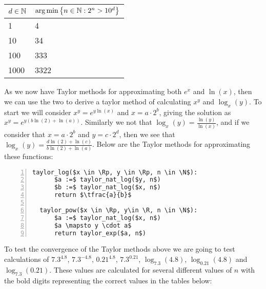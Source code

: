 \begin{center}
\begin{tabular}{|l|l|}
\hline
\(d \in \mathbb{N}\) 
	& \(\textrm{arg}\min\left\{n \in \mathbb{N} : 2^n > 10^d\right\}\)\\\hline
1 & 4\\\hline
10 & 34\\\hline
100 & 333 \\\hline
1000 & 3322\\\hline
\end{tabular}
\end{center}

As we now have Taylor methods for approximating both \(e^x\) and \(\ln(x)\), then we can use the two to derive a taylor method of calculating \(x^y\) and \(\log_x(y)\). To start we will consider \(x^y = e^{y\ln(x)}\) and \(x = a\cdot2^b\), giving the solution as \(x^y = e^{y(b\ln(2) + \ln(a))}\). Similarly we not that \(\log_x(y) = \frac{\ln(y)}{\ln(x)}\), and if we consider that \(x = a\cdot2^b\) and \(y = c\cdot2^d\), then we see that \(\log_x(y) = \frac{d\ln(2) + \ln(c)}{b\ln(2) + \ln(a)}\). Below are the Taylor methods for approximating these functions:

\begin{lstlisting}[numbers=left,frame=single,mathescape,caption={Taylor Method for calculating \(x^y\) and \(\log_x(y)\)},label={PCD_"taylor pow/log"}]
  taylor_log($x \in \Rp, y \in \Rp, n \in \N$):
      $a :=$ taylor_nat_log($y, n$)
      $b :=$ taylor_nat_log($x, n$)
      return $\tfrac{a}{b}$
  
  taylor_pow($x \in \Rp, y\in \R, n \in \N$):
      $a :=$ taylor_nat_log($x, n$)
      $a \mapsto y \cdot a$
      return taylor_exp($a, n$)
\end{lstlisting}

To test the convergence of the Taylor methods above we are going to test calculations of \(7.3^{4.8}\), \(7.3^{-4.8}\), \(0.21^{4.8}\), \(7.3^{0.21}\), \(\log_{7.3}(4.8)\), \(\log_{0.21}(4.8)\) and \(\log_{7.3}(0.21)\). These values are calculated for several different values of \(n\) with the bold digits representing the correct values in the tables below:

